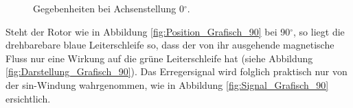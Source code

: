 \begin{figure}[h!]
\centering
{}
\hfill
{}
\hfill
{}
\hfill
\caption{Gegebenheiten bei Achsenstellung 0$^\circ$.}
\label{fig:Darstellungen_0_Grad}
\end{figure}

Steht der Rotor wie in Abbildung \ref{fig:Position_Grafisch_90} bei 90$^\circ$, so liegt die drehbarebare blaue Leiterschleife so, dass der von ihr ausgehende magnetische Fluss nur eine Wirkung auf die grüne Leiterschleife hat (siehe Abbildung \ref{fig:Darstellung_Grafisch_90}). Das Erregersignal wird folglich praktisch nur von der sin-Windung wahrgenommen, wie in Abbildung \ref{fig:Signal_Grafisch_90} ersichtlich.

